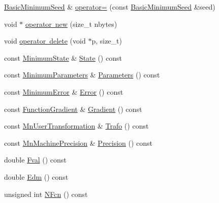 \begin{DoxyCompactItemize}
\item 
\mbox{\hyperlink{classROOT_1_1Minuit2_1_1BasicMinimumSeed}{Basic\+Minimum\+Seed}} \& \mbox{\hyperlink{classROOT_1_1Minuit2_1_1BasicMinimumSeed_aeffefca123cbfd95d19fa7fb7e087431}{operator=}} (const \mbox{\hyperlink{classROOT_1_1Minuit2_1_1BasicMinimumSeed}{Basic\+Minimum\+Seed}} \&seed)
\item 
void $\ast$ \mbox{\hyperlink{classROOT_1_1Minuit2_1_1BasicMinimumSeed_ae9ee17ec0140aa209e488b064675f3c3}{operator new}} (size\+\_\+t nbytes)
\item 
void \mbox{\hyperlink{classROOT_1_1Minuit2_1_1BasicMinimumSeed_ae2af98f9f03cfe5e5202153b914ff120}{operator delete}} (void $\ast$p, size\+\_\+t)
\item 
const \mbox{\hyperlink{classROOT_1_1Minuit2_1_1MinimumState}{Minimum\+State}} \& \mbox{\hyperlink{classROOT_1_1Minuit2_1_1BasicMinimumSeed_a92e671b9a963d83076238c2e2b283e7c}{State}} () const
\item 
const \mbox{\hyperlink{classROOT_1_1Minuit2_1_1MinimumParameters}{Minimum\+Parameters}} \& \mbox{\hyperlink{classROOT_1_1Minuit2_1_1BasicMinimumSeed_a0aec3622cdc4f1c52a4be74f8b96059a}{Parameters}} () const
\item 
const \mbox{\hyperlink{classROOT_1_1Minuit2_1_1MinimumError}{Minimum\+Error}} \& \mbox{\hyperlink{classROOT_1_1Minuit2_1_1BasicMinimumSeed_a108de61cfe9f1766c3d7e251202a29df}{Error}} () const
\item 
const \mbox{\hyperlink{classROOT_1_1Minuit2_1_1FunctionGradient}{Function\+Gradient}} \& \mbox{\hyperlink{classROOT_1_1Minuit2_1_1BasicMinimumSeed_ab61377b63a177c93629ccb3e69e173db}{Gradient}} () const
\item 
const \mbox{\hyperlink{classROOT_1_1Minuit2_1_1MnUserTransformation}{Mn\+User\+Transformation}} \& \mbox{\hyperlink{classROOT_1_1Minuit2_1_1BasicMinimumSeed_aa40157cea0a8a75b56af25bbc64f8d39}{Trafo}} () const
\item 
const \mbox{\hyperlink{classROOT_1_1Minuit2_1_1MnMachinePrecision}{Mn\+Machine\+Precision}} \& \mbox{\hyperlink{classROOT_1_1Minuit2_1_1BasicMinimumSeed_af06c66e8851f7314915e01e0bedb200c}{Precision}} () const
\item 
double \mbox{\hyperlink{classROOT_1_1Minuit2_1_1BasicMinimumSeed_a40b43b611717121256cd72bf40a3d5d7}{Fval}} () const
\item 
double \mbox{\hyperlink{classROOT_1_1Minuit2_1_1BasicMinimumSeed_a10659878d070bed73df23682eab3e88e}{Edm}} () const
\item 
unsigned int \mbox{\hyperlink{classROOT_1_1Minuit2_1_1BasicMinimumSeed_a1d34718bf163936432ef05dea799c469}{N\+Fcn}} () const

\end{DoxyCompactItemize}
